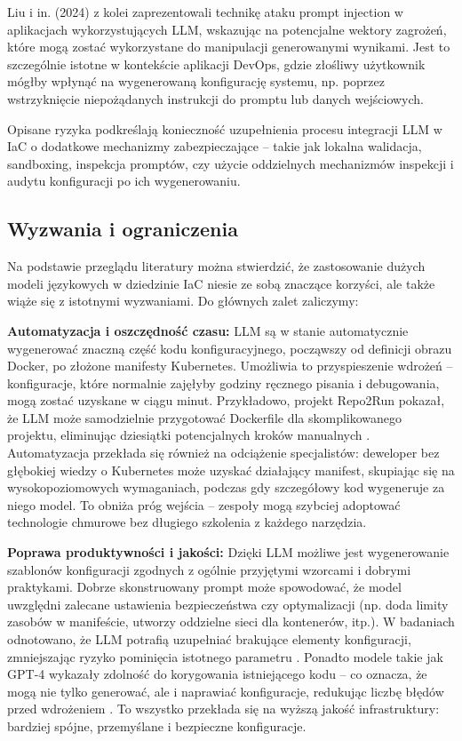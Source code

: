 Liu i in. (2024) \cite{liu_prompt_2024} z kolei zaprezentowali technikę ataku prompt injection w aplikacjach wykorzystujących LLM, wskazując na potencjalne wektory zagrożeń, które mogą zostać wykorzystane do manipulacji generowanymi wynikami. Jest to szczególnie istotne w kontekście aplikacji DevOps, gdzie złośliwy użytkownik mógłby wpłynąć na wygenerowaną konfigurację systemu, np. poprzez wstrzyknięcie niepożądanych instrukcji do promptu lub danych wejściowych.

Opisane ryzyka podkreślają konieczność uzupełnienia procesu integracji LLM w IaC o dodatkowe mechanizmy zabezpieczające – takie jak lokalna walidacja, sandboxing, inspekcja promptów, czy użycie oddzielnych mechanizmów inspekcji i audytu konfiguracji po ich wygenerowaniu.

\subsection{Wyzwania i ograniczenia}

Na podstawie przeglądu literatury można stwierdzić, że zastosowanie dużych modeli językowych w dziedzinie IaC niesie ze sobą znaczące korzyści, ale także wiąże się z istotnymi wyzwaniami. Do głównych zalet zaliczymy:

\textbf{Automatyzacja i oszczędność czasu:} LLM są w stanie automatycznie wygenerować znaczną część kodu konfiguracyjnego, począwszy od definicji obrazu Docker, po złożone manifesty Kubernetes. Umożliwia to przyspieszenie wdrożeń – konfiguracje, które normalnie zajęłyby godziny ręcznego pisania i debugowania, mogą zostać uzyskane w ciągu minut. Przykładowo, projekt Repo2Run pokazał, że LLM może samodzielnie przygotować Dockerfile dla skomplikowanego projektu, eliminując dziesiątki potencjalnych kroków manualnych \cite{hu_llm-based_2025}. Automatyzacja przekłada się również na odciążenie specjalistów: deweloper bez głębokiej wiedzy o Kubernetes może uzyskać działający manifest, skupiając się na wysokopoziomowych wymaganiach, podczas gdy szczegółowy kod wygeneruje za niego model. To obniża próg wejścia – zespoły mogą szybciej adoptować technologie chmurowe bez długiego szkolenia z każdego narzędzia.

\textbf{Poprawa produktywności i jakości:} Dzięki LLM możliwe jest wygenerowanie szablonów konfiguracji zgodnych z ogólnie przyjętymi wzorcami i dobrymi praktykami. Dobrze skonstruowany prompt może spowodować, że model uwzględni zalecane ustawienia bezpieczeństwa czy optymalizacji (np. doda limity zasobów w manifeście, utworzy oddzielne sieci dla kontenerów, itp.). W badaniach odnotowano, że LLM potrafią uzupełniać brakujące elementy konfiguracji, zmniejszając ryzyko pominięcia istotnego parametru \cite{kratzke_dont_2024}. Ponadto modele takie jak GPT-4 wykazały zdolność do korygowania istniejącego kodu – co oznacza, że mogą nie tylko generować, ale i naprawiać konfiguracje, redukując liczbę błędów przed wdrożeniem \cite{low_repairing_2024}. To wszystko przekłada się na wyższą jakość infrastruktury: bardziej spójne, przemyślane i bezpieczne konfiguracje.

